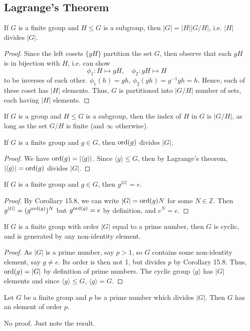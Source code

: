 \documentclass[a4paper]{article}
\begin{document}
\subsection{Lagrange's Theorem}
\begin{thm}
If $G$ is a finite group and $H\leq G$ is a subgroup, then $|G|=|H||G/H|$, i.e. $|H|$ divides $|G|$.
\end{thm}
\begin{proof}
Since the left cosets $\{gH\}$ partition the set $G$, then observe that each $gH$ is in bijection with $H$, i.e. can show
$$\phi_1: H\mapsto gH,\quad \phi_2: gH\mapsto H$$
to be inverses of each other. $\phi_1(h)=gh$, $\phi_2(gh)=g^{-1}gh=h$. Hence, each of these coset has $|H|$ elements. Thus, $G$ is partitioned into $|G/H|$ number of sets, each having $|H|$ elements.
\end{proof}
\begin{defi}
If $G$ is a group and $H\leq G$ is a subgroup, then the index of $H$ in $G$ is $|G/H|$, as long as the set $G/H$ is finite (and $\infty$ otherwise).
\end{defi}
\begin{cor}
If $G$ is a finite group and $g\in G$, then $\operatorname{ord}(g)$ divides $|G|$.
\end{cor}
\begin{proof}
We have $\operatorname{ord}(g)=|\langle g\rangle|$. Since $\langle g\rangle\leq G$, then by Lagrange's theorem, $|\langle g\rangle|=\operatorname{ord}(g)$ divides $|G|$. 
\end{proof}
\begin{cor}
If $G$ is a finite group and $g\in G$, then $g^{|G|}=e$.
\end{cor}
\begin{proof}
By Corollary 15.8, we can write $|G|=\operatorname{ord}(g)N$ for some $N\in\mathbb{Z}$. Then $g^{|G|}=(g^{\operatorname{ord}(g)})^N$ but $g^{\operatorname{ord}(g)}=e$ by definition, and $e^N=e$.
\end{proof}
\begin{cor}
If $G$ is a finite group with order $|G|$ equal to a prime number, then $G$ is cyclic, and is generated by any non-identity element.
\end{cor}
\begin{proof}
As $|G|$ is a prime number, say $p>1$, so $G$ contains some non-identity element, say $g\neq e$. Its order is then not 1, but divides $p$ by Corollary 15.8. Thus, $\operatorname{ord}(g)=|G|$ by definition of prime numbers. The cyclic group $\langle g\rangle$ has $|G|$ elements and since $\langle g\rangle\leq G$, $\langle g\rangle=G$.
\end{proof}
\begin{thm}
Let $G$ be a finite group and $p$ be a prime number which divides $|G|$. Then $G$ has an element of order $p$.
\end{thm}
No proof. Just note the result.
\newpage
\end{document}

